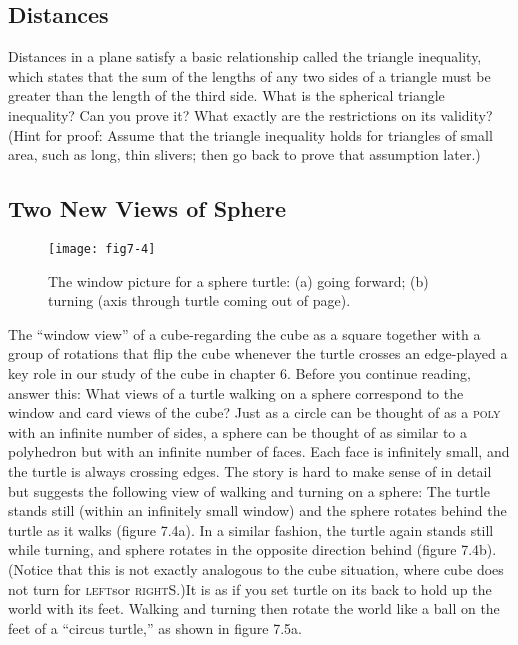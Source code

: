 \documentclass{book}
\begin{document}
\subsection{Distances}

Distances in a plane satisfy a basic relationship called the triangle inequality, which states that the sum of the lengths of any two sides of
a triangle must be greater than the length of the third side. What is
the spherical triangle inequality? Can you prove it? What exactly are
the restrictions on its validity? (Hint for proof: Assume that the triangle
inequality holds for triangles of small area, such as long, thin slivers;
then go back to prove that assumption later.)

\subsection{Two New Views of Sphere}

\begin{figure}
\begin{center}
\texttt{[image: fig7-4]}
\caption{The window picture for a sphere turtle: (a) going forward; (b) turning (axis through turtle coming out of page).}
\end{center}
\end{figure}

The ``window view'' of a cube-regarding the cube as a square together
with a group of rotations that flip the cube whenever the turtle crosses
an edge-played a key role in our study of the cube in chapter 6. Before
you continue reading, answer this: What views of a turtle walking on a
sphere correspond to the window and card views of the cube?
Just as a circle can be thought of as a \textsc{poly} with an infinite number
of sides, a sphere can be thought of as similar to a polyhedron but with
an infinite number of faces. Each face is infinitely small, and the turtle
is always crossing edges. The story is hard to make sense of in detail
but suggests the following view of walking and turning on a sphere: The
turtle stands still (within an infinitely small window) and the sphere
rotates behind the turtle as it walks (figure 7.4a). In a similar fashion,
the turtle again stands still while turning, and sphere rotates in the
opposite direction behind (figure 7.4b). (Notice that this is not exactly
analogous to the cube situation, where cube does not turn for \textsc{left}sor
\textsc{right}S.)It is as if you set turtle on its back to hold up the world with
its feet. Walking and turning then rotate the world like a ball on the
feet of a ``circus turtle,'' as shown in figure 7.5a.
\end{document}
